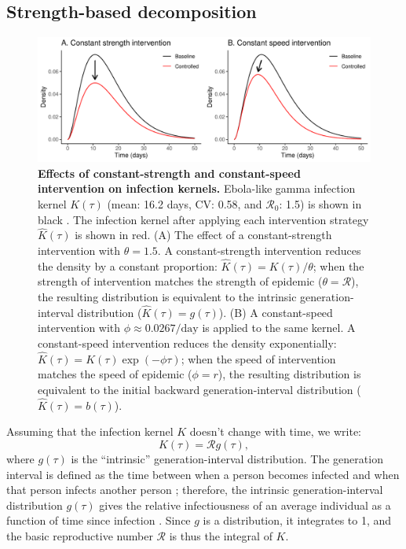 \documentclass[12pt]{article}
\newcommand{\Rx}[1]{\ensuremath{{\mathcal R}_{#1}}}
\newcommand{\Ro}{\Rx{0}}
\newcommand{\RR}{\ensuremath{{\mathcal R}}}
\newcommand{\figlab}[1]{\label{fig:#1}}
\newcommand{\eqlab}[1]{\label{eq:#1}}
\begin{document}
\subsection{Strength-based decomposition}


\begin{figure}[!t]
\includegraphics[width=\textwidth]{../figure/constant_intervention.pdf}
\caption{
\textbf{Effects of constant-strength and constant-speed intervention on infection kernels.}
Ebola-like gamma infection kernel $K(\tau)$ (mean: 16.2 days, CV: 0.58, and \Ro: 1.5) is shown in black \citep{park2019practical}.
The infection kernel after applying each intervention strategy $\hat K(\tau)$ is shown in red.
(A) The effect of a constant-strength intervention with $\theta = 1.5$.
A constant-strength intervention reduces the density by a constant proportion: $\hat K(\tau) = K(\tau)/\theta$; when the strength of intervention matches the strength of epidemic ($\theta = \mathcal R$), the resulting distribution is equivalent to the intrinsic generation-interval distribution ($\hat K(\tau) = g(\tau)$).
(B) A constant-speed intervention with $\phi \approx 0.0267/\mathrm{day}$ is applied to the same kernel.
A constant-speed intervention reduces the density exponentially: $\hat K(\tau) = K(\tau) \exp(-\phi \tau)$; when the speed of intervention matches the speed of epidemic ($\phi = r$), the resulting distribution is equivalent to the initial backward generation-interval distribution ($\hat K(\tau) = b(\tau)$). 
}
\figlab{constant}
\end{figure}

Assuming that the infection kernel $K$ doesn't change with time, we write:
\begin{equation}
	K(\tau) = \RR g(\tau),
	\eqlab{strengthFactors}
\end{equation}
where $g(\tau)$ is the ``intrinsic'' generation-interval distribution.
The generation interval is defined as the time between when a person becomes infected and when that person infects another person \citep{svensson2007note};
therefore, the intrinsic generation-interval distribution $g(\tau)$ gives the relative infectiousness of an average individual as a function of time since infection \citep{champredon2015intrinsic}. 
Since $g$ is a distribution, it integrates to 1, and the basic reproductive number $\RR$ is thus the integral of $K$.
\end{document}
